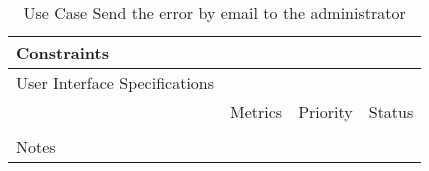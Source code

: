 \begin{table}[H]
\begin{tabularx}{\linewidth}{|l|X|X|X|}
    \hline Constraints                   & \multicolumn{3}{l|}{}                                                                                 \\

    \hline User Interface Specifications & \multicolumn{3}{l|}{}                                                                                 \\

    \hline \multirow{2}{*}{}             & Metrics                                                                           & Priority & Status \\
    \cline{2-4}                          &                                                                                   &          &        \\
    \hline Notes                         & \multicolumn{3}{l|}{}                                                                                 \\
    \hline
  \end{tabularx}
  \caption{Use Case Send the error by email to the administrator}
  \label{tab:use_case_send_error_by_email_to_the_administrator}
\end{table}

